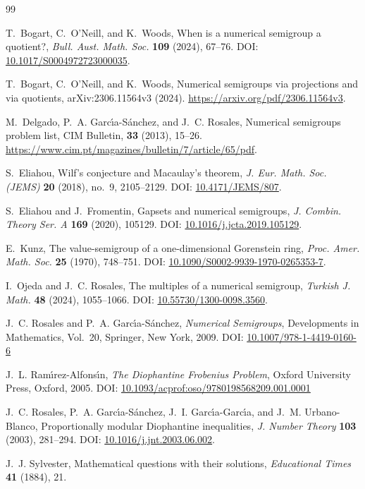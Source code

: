 \documentclass[12pt,a4paper]{amsart}
\theoremstyle{definition}
\theoremstyle{remark}
\begin{document}
\begin{thebibliography}{99}
\newcommand{\doi}[1]{DOI: \href{https://doi.org/#1}{#1}}

T.~Bogart, C.~O'Neill, and K.~Woods,
When is a numerical semigroup a quotient?,
\emph{Bull. Aust. Math. Soc.} \textbf{109} (2024), 67--76.
\doi{10.1017/S0004972723000035}.

T.~Bogart, C.~O'Neill, and K.~Woods,
Numerical semigroups via projections and via quotients,
arXiv:2306.11564v3 (2024).
\url{https://arxiv.org/pdf/2306.11564v3}.

M.~Delgado, P.~A. Garc\'{\i}a-S\'anchez, and J.~C. Rosales,
Numerical semigroups problem list, CIM Bulletin, 
\textbf{33} (2013), 15--26. \url{https://www.cim.pt/magazines/bulletin/7/article/65/pdf}.

S.~Eliahou,
Wilf's conjecture and Macaulay's theorem,
\emph{J. Eur. Math. Soc. (JEMS)} \textbf{20} (2018), no.~9, 2105--2129.
\doi{10.4171/JEMS/807}.

S.~Eliahou and J.~Fromentin,
Gapsets and numerical semigroups,
\emph{J. Combin. Theory Ser. A} \textbf{169} (2020), 105129.
\doi{10.1016/j.jcta.2019.105129}.

E.~Kunz,
The value-semigroup of a one-dimensional Gorenstein ring,
\emph{Proc. Amer. Math. Soc.} \textbf{25} (1970), 748--751.
\doi{10.1090/S0002-9939-1970-0265353-7}.

I.~Ojeda and J.~C. Rosales,
The multiples of a numerical semigroup,
\emph{Turkish J. Math.} \textbf{48} (2024), 1055--1066.
\doi{10.55730/1300-0098.3560}.

J.~C. Rosales and P.~A. Garc\'{\i}a-S\'anchez,
\emph{Numerical Semigroups},
Developments in Mathematics, Vol.~20, Springer, New York, 2009.
\doi{10.1007/978-1-4419-0160-6}

J.~L. Ram\'{\i}rez-Alfons\'{\i}n,
\emph{The Diophantine Frobenius Problem},
Oxford University Press, Oxford, 2005.
\doi{10.1093/acprof:oso/9780198568209.001.0001}

J.~C. Rosales, P.~A. Garc\'{\i}a-S\'anchez, J.~I. Garc\'{\i}a-Garc\'{\i}a, and J.~M. Urbano-Blanco,
Proportionally modular Diophantine inequalities,
\emph{J. Number Theory} \textbf{103} (2003), 281--294.
\doi{10.1016/j.jnt.2003.06.002}.

J.~J. Sylvester,
Mathematical questions with their solutions,
\emph{Educational Times} \textbf{41} (1884), 21.

\end{thebibliography}
\end{document}
